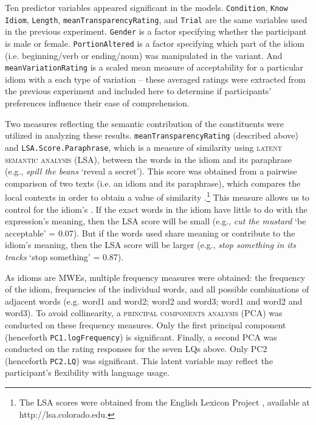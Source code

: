 \documentclass[output=paper,modfonts,nonflat]{langsci/langscibook}
\begin{document}
Ten predictor variables appeared significant in the models. \texttt{Condition}, \texttt{Know Idiom}, \texttt{Length}, \texttt{meanTransparencyRating}, and \texttt{Trial} are the same variables used in the previous experiment. \texttt{Gender} is a factor specifying whether the participant is male or female. \texttt{PortionAltered} is a factor specifying which part of the idiom (i.e. beginning/verb or ending/noun) was manipulated in the variant. And \texttt{meanVariationRating} is a scaled mean measure of acceptability for a particular idiom with a each type of variation -- these averaged ratings were extracted from the previous experiment and included here to determine if participants' preferences influence their ease of comprehension.

Two measures reflecting the semantic contribution of the constituents were utilized in analyzing these results. \texttt{meanTransparencyRating} (described above) and \texttt{LSA.Score.Paraphrase}, which is a measure of similarity using \textsc{latent semantic analysis} (LSA), between the words in the idiom and its paraphrase (e.g., \textit{spill the beans} `reveal a secret'). This score was obtained from a pairwise comparison of two texts (i.e. an idiom and its paraphrase), which compares the local contexts in order to obtain a value of similarity \citep{LandauerEtAl1998}.\footnote{The LSA scores were obtained from the English Lexicon Project \citep{BalotaEtAl2007}, available at http://lsa.colorado.edu.} This measure allows us to control for the idiom's . If the exact words in the idiom have little to do with the expression's meaning, then the LSA score will be small (e.g., \textit{cut the mustard} `be acceptable' = 0.07). But if the words used share meaning or contribute to the idiom's meaning, then the LSA score will be larger (e.g., \textit{stop something in its tracks} `stop something' = 0.87).
   
As idioms are MWEs, multiple frequency measures were obtained: the frequency of the idiom, frequencies of the individual words, and all possible combinations of adjacent words (e.g. word1 and word2; word2 and word3; word1 and word2 and word3). To avoid collinearity, a \textsc{principal components analysis} (PCA) was conducted on these frequency measures. Only the first principal component (henceforth \texttt{PC1.logFrequency}) is significant. Finally, a second PCA was conducted on the rating responses for the seven LQs above. Only PC2 (henceforth \texttt{PC2.LQ}) was significant. This latent variable may reflect the participant's flexibility with language usage.
\end{document}
